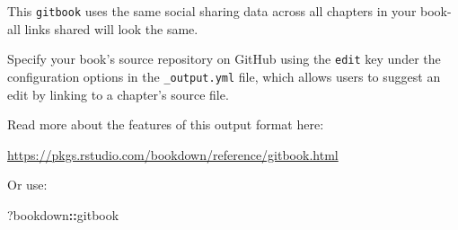 \documentclass[
]{book}
\newenvironment{Shaded}{\begin{snugshade}}{\end{snugshade}}
\newcommand{\NormalTok}[1]{#1}
\newcommand{\SpecialCharTok}[1]{\textcolor[rgb]{0.81,0.36,0.00}{\textbf{#1}}}
\theoremstyle{definition}
\theoremstyle{definition}
\theoremstyle{definition}
\theoremstyle{definition}
\theoremstyle{remark}
\begin{document}
This \texttt{gitbook} uses the same social sharing data across all chapters in your book- all links shared will look the same.

Specify your book's source repository on GitHub using the \texttt{edit} key under the configuration options in the \texttt{\_output.yml} file, which allows users to suggest an edit by linking to a chapter's source file.

Read more about the features of this output format here:

\url{https://pkgs.rstudio.com/bookdown/reference/gitbook.html}

Or use:

\begin{Shaded}
\begin{Highlighting}[]
\NormalTok{?bookdown}\SpecialCharTok{::}\NormalTok{gitbook}
\end{Highlighting}
\end{Shaded}


  
\end{document}
